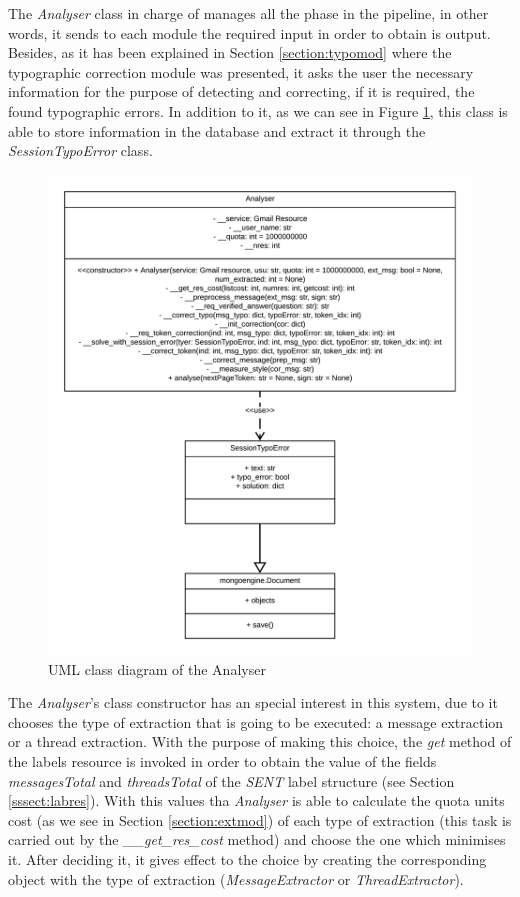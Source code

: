The \textit{Analyser} class in charge of manages all the phase in the pipeline, in other words, it sends to each module the required input in order to obtain is output. Besides, as it has been explained in Section \ref{section:typomod} where the typographic correction module was presented, it asks the user the necessary information for the purpose of detecting and correcting, if it is required, the found typographic errors. In addition to it, as we can see in Figure \ref{fig:umlanalyser}, this class is able to store information in the database and extract it through the \textit{SessionTypoError} class.

\begin{figure}[h]
	\centering%
	\centerline{\includegraphics[width=0.6\paperwidth]{Imagenes/Bitmap/Analyser/analyserUML.png}}%
	\caption{UML class diagram of the Analyser}%
	\label{fig:umlanalyser}
\end{figure}

The \textit{Analyser}'s class constructor has an special interest in this system, due to it chooses the type of extraction that is going to be executed: a message extraction or a thread extraction. With the purpose of making this choice, the \textit{get} method of the labels resource is invoked in order to obtain the value of the fields \textit{messagesTotal} and \textit{threadsTotal} of the \textit{SENT} label structure (see Section \ref{sssect:labres}). With this values tha \textit{Analyser} is able to calculate the quota units cost (as we see in Section \ref{section:extmod}) of each type of extraction (this task is carried out by the \textit{\_\_get\_res\_cost} method) and choose the one which minimises it. After deciding it, it gives effect to the choice by creating the corresponding object with the type of extraction (\textit{MessageExtractor} or \textit{ThreadExtractor}).

